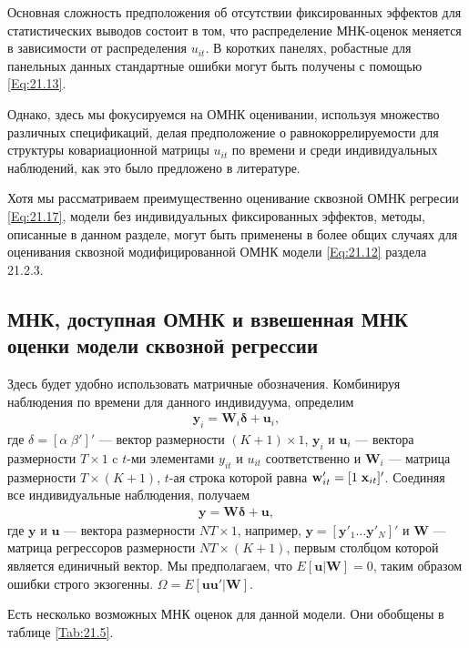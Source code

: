 Основная сложность предположения об отсутствии фиксированных эффектов для статистических выводов состоит в том, что распределение МНК-оценок меняется в зависимости от распределения $u_{it}$. В коротких панелях, робастные для панельных данных стандартные ошибки могут быть получены с помощью \ref{Eq:21.13}.

Однако, здесь мы фокусируемся на ОМНК оценивании, используя множество различных спецификаций, делая предположение о равнокоррелируемости для структуры ковариационной матрицы $u_{it}$  по времени и среди индивидуальных наблюдений, как это было предложено в литературе.

Хотя мы рассматриваем преимущественно оценивание сквозной ОМНК регресии \ref{Eq:21.17}, модели без индивидуальных фиксированных эффектов, методы, описанные в данном разделе, могут быть применены в более общих случаях для оценивания сквозной модифицированной ОМНК модели \ref{Eq:21.12} раздела 21.2.3.

\subsection{МНК, доступная ОМНК и взвешенная МНК оценки модели сквозной регрессии}

Здесь будет удобно использовать матричные обозначения. Комбинируя наблюдения по времени для данного индивидуума, определим
\begin{align}
\mathbf y_{i}=\mathbf W_{i}\bm\delta+\mathbf u_{i},
\label{Eq:21.18}
\end{align}
где $\delta=[\alpha \; \beta']'$ --- вектор размерности  $(K+1)\times 1$, $\mathbf y_i$ и $\mathbf u_i$ --- вектора размерности $T \times 1$ c $t$-ми элементами $y_{it}$ и $u_{it}$ соответственно и $\mathbf W_i$ --- матрица размерности $T \times (K+1)$, $t$-ая строка которой равна $\mathbf w'_{it}=[1 \; \mathbf{x}_{it}]'$. Соединяя все индивидуальные наблюдения, получаем
\begin{align}
\mathbf y=\mathbf W\bm\delta+ \mathbf u,
\label{Eq:21.19}
\end{align}
где $\mathbf y$  и $\mathbf u$ --- вектора размерности $NT \times 1$, например, $\mathbf y=[\mathbf y'_1 \dots \mathbf y'_N]'$ и $\mathbf W$ --- матрица регрессоров размерности $NT \times (K + 1)$, первым столбцом которой является единичный вектор. Мы предполагаем, что $E[\mathbf u| \mathbf W]=0$, таким образом ошибки строго экзогенны. $\Omega=E[\mathbf u \mathbf u'|\mathbf W]$.

Есть несколько возможных МНК оценок для данной модели. Они обобщены в таблице \ref{Tab:21.5}.

